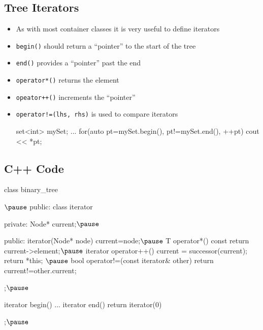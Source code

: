 \begin{slide}
\section[-2]{Tree Iterators}

\begin{PauseHighLight}
  \begin{itemize}
  \item As with most container classes it is very useful to define
    iterators\pause
  \item \texttt{begin()} should return a ``pointer'' to the start of
    the tree\pause
  \item \texttt{end()} provides a ``pointer'' past the end\pause
  \item \texttt{operator*()} returns the element\pause
  \item \texttt{opeator++()} increments the ``pointer''\pause
  \item \texttt{operator!=(lhs, rhs)} is used to compare iterators\pause
    \begin{cpp}
      set<int> mySet;
      ...
      for(auto pt=mySet.begin(), pt!=mySet.end(), ++pt) {
        cout << *pt;
      }
    \end{cpp}\pause
  \end{itemize}
\end{PauseHighLight}
\end{slide}



\begin{slide}
\section[-2]{C++ Code}

\begin{cpp}
class binary_tree {
$\pause$
public:
  class iterator {
  private:
    Node* current;$\pause$
    
  public:
    iterator(Node* node) {current=node;}$\pause$
    T operator*() const {return current->element;}$\pause$
    iterator operator++() {
      current = successor(current);
      return *this;
    }$\pause$
    bool operator!=(const iterator& other) {
      return current!=other.current;
    }
  };$\pause$

  iterator begin() {...}
  iterator end() {return iterator(0)}

};$\pause$
\end{cpp}
\end{slide}

